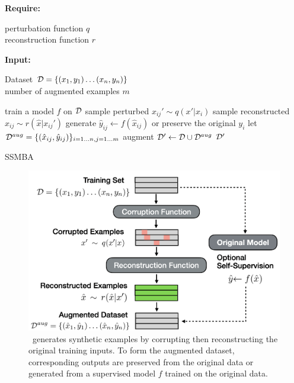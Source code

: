 \begin{algorithm}
\begin{algorithmic}[1]
    \State \textbf{Require:} \parbox[t]{\dimexpr\linewidth-\algorithmicindent}{perturbation function $q$\\ reconstruction function $r$ \strut}
    \State \textbf{Input:} \parbox[t]{\dimexpr\linewidth-\algorithmicindent}{Dataset $\mathcal{D} = \{(x_1, y_1)\ldots(x_n, y_n)\}$\\ number of augmented examples $m$ \strut}
    \State train a model $f$ on $\mathcal{D}$
            \State sample perturbed $x_{ij}' \sim q(x'|x_i)$
            \State sample reconstructed $\hat{x}_{ij} \sim r(\hat{x}|x_{ij}')$ 
            \State generate $\hat{y}_{ij} \gets f(\hat{x}_{ij})$ or preserve \Statex[3] the original $y_i$
        \EndFor
    \EndFor
    \State let $\mathcal{D}^{aug} = \{(\hat{x}_{ij}, \hat{y}_{ij})\}_{i=1\ldots n,j=1\ldots m}$
    \State augment $ \mathcal{D}' \leftarrow \mathcal{D} \cup \mathcal{D}^{aug}$ 
    \State \Return $\mathcal{D}'$
    \EndFunction
\end{algorithmic}
\caption{SSMBA}
\label{alg:ssmba}
\end{algorithm}

\begin{figure}[t]
\centering
\includegraphics[scale=0.225]{img/ssmba_graph.png}
\caption{\ssmba\ generates synthetic examples by corrupting then reconstructing the original training inputs. 
To form the augmented dataset, corresponding outputs are preserved from the original data or generated from a supervised model $f$ trained on the original data.}
\label{fig:ssmba_graph}
\end{figure}

